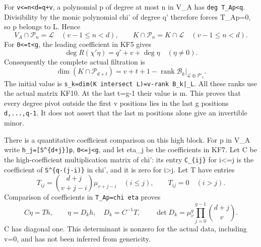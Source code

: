 \documentclass[11pt]{article}
\begin{document}
For \texttt{v\textless{}=n\textless{}d=q\textquotesingle{}+v}, a polynomial p of degree at most n in V\_A has \texttt{deg\ T\_Ap\textless{}q\textquotesingle{}}. Divisibility by the monic polynomial chi' of degree q' therefore forces T\_Ap=0, so p belongs to L. Hence \[
V_A\cap\mathcal P_n=\mathcal L\quad(v-1\le n<d),\qquad
K\cap\mathcal P_n=K\cap\mathcal L\quad(v-1\le n<d).
\tag{KF11}
\] For \texttt{0\textless{}=t\textless{}g}, the leading coefficient in KF5 gives \[
\deg R(\chi'\eta)=q'+v+\deg\eta\quad(\eta\ne0).
\] Consequently the complete actual filtration is \[
\dim(K\cap\mathcal P_{d+t})
=v+t+1-\operatorname{rank}
 \mathcal B_k\big|_{\mathcal L\oplus\mathcal P'_t}.
\tag{KF12}
\] The initial value is \nolinkurl{s_k=dim(K intersect L)=v-rank B_k|_L}. All these ranks use the actual matrix KF10. At the last t=g-1 their value is m. This proves that every degree pivot outside the first v positions lies in the last g positions \texttt{d,...,q-1}. It does not assert that the last m positions alone give an invertible minor.

There is a quantitative coefficient comparison on this high block. For p in V\_A write \texttt{h\_j={[}S\^{}\{d+j\}{]}p}, \texttt{0\textless{}=j\textless{}g}, and let eta\_j be the coefficients in KF7. Let C be the high-coefficient multiplication matrix of chi': its entry \texttt{C\_\{ij\}} for i\textless=j is the coefficient of \texttt{S\textquotesingle{}\^{}\{q\textquotesingle{}-(j-i)\}} in chi', and it is zero for i\textgreater j. Let T have entries \[
T_{ij}=\binom{d+j}{v+j-i}\mu_{v+j-i}\quad(i\le j),\qquad
T_{ij}=0\quad(i>j).
\tag{KF13}
\] Comparison of coefficients in \texttt{T\_Ap=chi\textquotesingle{}\ eta} proves \[
C\eta=Th,\qquad \eta=D_kh,\quad D_k=C^{-1}T,
\qquad
\det D_k=\mu_v^g\prod_{j=0}^{g-1}\binom{d+j}{v}.
\tag{KF14}
\] C has diagonal one. This determinant is nonzero for the actual data, including v=0, and has not been inferred from genericity.
\end{document}
